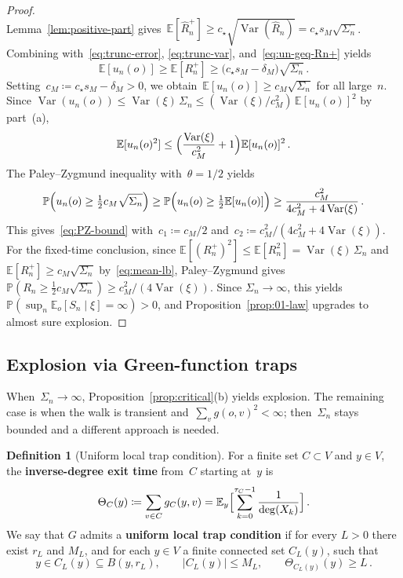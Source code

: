 \documentclass[11pt]{amsart}
\theoremstyle{plain}
\theoremstyle{definition}
\newtheorem{definition}[theorem]{Definition}
\newcommand{\E}{\mathbb{E}}
\renewcommand{\P}{\mathbb{P}}
\DeclareMathOperator{\var}{Var}
\begin{document}
\begin{proof}
\[		\]
		Lemma~\ref{lem:positive-part} gives~$\E[\hat R_n^+]\geq c_\star\sqrt{\var(\hat R_n)}= c_\star s_M\sqrt{\Sigma_n}$.
		Combining with~\eqref{eq:trunc-error}, \eqref{eq:trunc-var}, and~\eqref{eq:un-geq-Rn+} yields
		\begin{equation}\label{eq:mean-lb}
			\E[u_n(o)]\geq\E[R_n^+]
			\geq\bigl(c_\star s_M-\delta_M\bigr)\sqrt{\Sigma_n}\,.
		\end{equation}
		Setting~$c_M\coloneqq c_\star s_M-\delta_M>0$, we obtain~$\E[u_n(o)]\geq c_M\sqrt{\Sigma_n}$ for all large~$n$. Since $\var(u_n(o))\leq\var(\xi)\,\Sigma_n\leq(\var(\xi)/c_M^2)\,\E[u_n(o)]^2$ by part~(a),
		\[
		\E[u_n(o)^2]\leq\Bigl(\frac{\var(\xi)}{c_M^2}+1\Bigr)\E[u_n(o)]^2\,.
		\]
		The Paley--Zygmund inequality with~$\theta=1/2$ yields
		\[
		\P\Bigl(u_n(o)\geq\tfrac{1}{2}c_M\sqrt{\Sigma_n}\Bigr)
		\geq\P\Bigl(u_n(o)\geq\tfrac{1}{2}\E[u_n(o)]\Bigr)
		\geq\frac{c_M^2}{4c_M^2+4\var(\xi)}\,.
		\]
		This gives~\eqref{eq:PZ-bound} with~$c_1\coloneqq c_M/2$ and~$c_2\coloneqq c_M^2/(4c_M^2+4\var(\xi))$.
		For the fixed-time conclusion, since $\E[(R_n^+)^2]\leq\E[R_n^2]=\var(\xi)\,\Sigma_n$ and $\E[R_n^+]\geq c_M\sqrt{\Sigma_n}$ by~\eqref{eq:mean-lb}, Paley--Zygmund gives $\P(R_n\geq\tfrac{1}{2}c_M\sqrt{\Sigma_n})\geq c_M^2/(4\var(\xi))$. Since $\Sigma_n\to\infty$, this yields $\P(\sup_n\E_o[S_n\mid\xi]=\infty)>0$, and Proposition~\ref{prop:01-law} upgrades to almost sure explosion.
	\end{proof}
	
	
	\subsection{Explosion via Green-function traps}
	When~$\Sigma_n\to\infty$, Proposition~\ref{prop:critical}(b) yields explosion.
	The remaining case is when the walk is transient and~$\sum_v g(o,v)^2<\infty$; then~$\Sigma_n$ stays bounded and a different approach is needed.
	
	\begin{definition}[Uniform local trap condition]\label{def:trap-family}
		For a finite set $C\subset V$ and $y\in V$, the \textbf{inverse-degree exit time} from~$C$ starting at~$y$ is
		\[
		\Theta_C(y)\coloneqq\sum_{v\in C}g_C(y,v)=\E_y\Bigl[\sum_{k=0}^{\tau_C-1}\frac{1}{\deg(X_k)}\Bigr]\,.
		\]
		We say that $G$ admits a \textbf{uniform local trap condition} if for every $L>0$ there exist $r_L$ and $M_L$, and for each $y\in V$ a finite connected set $C_L(y)$, such that
		\[
		y\in C_L(y)\subseteq B(y,r_L),\qquad |C_L(y)|\leq M_L,\qquad\Theta_{C_L(y)}(y)\geq L\,.
		\]
	\end{definition}
	
\end{document}
